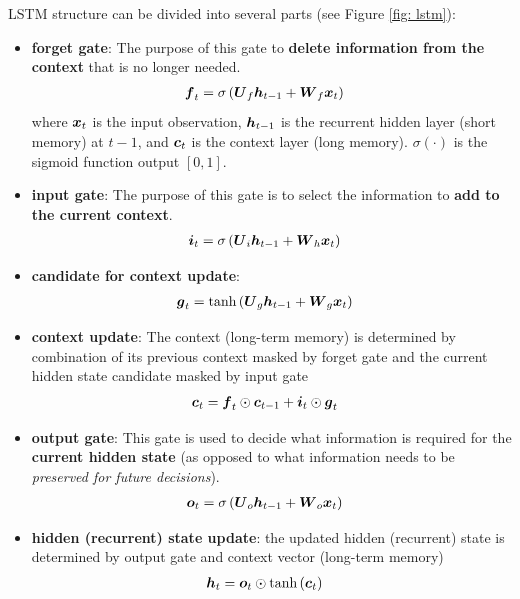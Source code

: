 \documentclass[11pt]{article}
\begin{document}
LSTM structure can be divided into several parts (see Figure \ref{fig: lstm}):
\begin{itemize}
\item \textbf{forget gate}: The purpose of this gate to \textbf{delete information from the context} that is no longer needed.
\begin{align*}
\boldsymbol{f}_{t} &= \sigma\left(\boldsymbol{U}_{f}\boldsymbol{h}_{t-1} + \boldsymbol{W}_{f}\boldsymbol{x}_{t}\right) 
\end{align*} where $\boldsymbol{x}_{t}$ is the input observation, $\boldsymbol{h}_{t-1}$ is the recurrent hidden layer (short memory) at $t-1$, and $\boldsymbol{c}_{t}$ is the context layer (long memory). $\sigma(\cdot)$ is the sigmoid function output $[0,1]$.

\item \textbf{input gate}: The purpose of this gate is to select the information to \textbf{add to the current context}.
\begin{align*}
\boldsymbol{i}_{t} &= \sigma\left(\boldsymbol{U}_{i}\boldsymbol{h}_{t-1} +  \boldsymbol{W}_{h}\boldsymbol{x}_{t}\right)
\end{align*}

\item \textbf{candidate for context update}: 
\begin{align*}
\boldsymbol{g}_{t} &= \text{tanh}\left(\boldsymbol{U}_{g}\boldsymbol{h}_{t-1} + \boldsymbol{W}_{g}\boldsymbol{x}_{t}\right)
\end{align*}


\item \textbf{context update}: The context (long-term memory) is determined by combination of its previous context masked by forget gate and the current hidden state candidate masked by input gate
\begin{align*}
\boldsymbol{c}_{t} &= \boldsymbol{f}_{t}\odot \boldsymbol{c}_{t-1} + \boldsymbol{i}_{t}\odot \boldsymbol{g}_{t}
\end{align*}


\item \textbf{output gate}: This gate is used to decide what information is required for the \textbf{current hidden state} (as opposed to what information needs
to be \emph{preserved for future decisions}).
\begin{align*}
\boldsymbol{o}_{t} &= \sigma\left(\boldsymbol{U}_{o}\boldsymbol{h}_{t-1} +  \boldsymbol{W}_{o}\boldsymbol{x}_{t}\right)
\end{align*}

\item \textbf{hidden (recurrent) state update}: the updated hidden (recurrent) state is determined by output gate and context vector (long-term memory)
\begin{align*}
\boldsymbol{h}_{t} &= \boldsymbol{o}_{t}\odot \text{tanh}\left(\boldsymbol{c}_{t}\right)
\end{align*}
\end{itemize}
\end{document}
